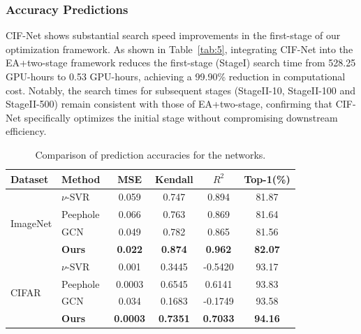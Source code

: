 \documentclass[a4paper,fleqn]{cas-sc}
\begin{document}
\subsubsection{Accuracy Predictions}
CIF-Net shows substantial search speed improvements in the first-stage of our optimization framework. As shown in Table~\ref{tab:5}, integrating CIF-Net into the EA+two-stage framework reduces the first-stage (StageI) search time from 528.25 GPU-hours to 0.53 GPU-hours, achieving a 99.90\% reduction in computational cost. Notably, the search times for subsequent stages (StageII-10, StageII-100 and StageII-500) remain consistent with those of EA+two-stage, confirming that CIF-Net specifically optimizes the initial stage without compromising downstream efficiency.
\begin{table}[ht]
\centering
\caption{Comparison of prediction accuracies for the networks.}
\small
\begin{tabular}{l l c c c c}
\toprule[1.5pt]
Dataset & Method   & MSE   & Kendall & $R^2$  & Top-1(\%) \\
\midrule
\multicolumn{1}{l}{\multirow{4}{*}{ImageNet}} & $\nu$-SVR~\cite{Baker2017}  & 0.059 & 0.747   & 0.894 & 81.87\\
~ & Peephole~\cite{Deng2017} & 0.066  & 0.763    & 0.869   & 81.64\\
~ & GCN~\cite{Qin2022} & 0.049 & 0.782   & 0.865 & 81.56\\
\cline{2-6}
~ & \textbf{Ours} & \textbf{0.022} & \textbf{0.874}   & \textbf{0.962} & \textbf{82.07}\\
\midrule
\multicolumn{1}{l}{\multirow{4}{*}{CIFAR}} & $\nu$-SVR~\cite{Baker2017}  & 0.001 & 0.3445   & -0.5420 & 93.17\\
~ & Peephole~\cite{Deng2017} & 0.0003  & 0.6545  & 0.6141 & 93.83\\
~ & GCN~\cite{Qin2022} & 0.034 & 0.1683   & -0.1749  & 93.58\\
\cline{2-6}
~ & \textbf{Ours} & \textbf{0.0003} & \textbf{0.7351}   & \textbf{0.7033} & \textbf{94.16}\\
\bottomrule[1.5pt]
\end{tabular}
\label{tab:6}
\end{table}
\end{document}
